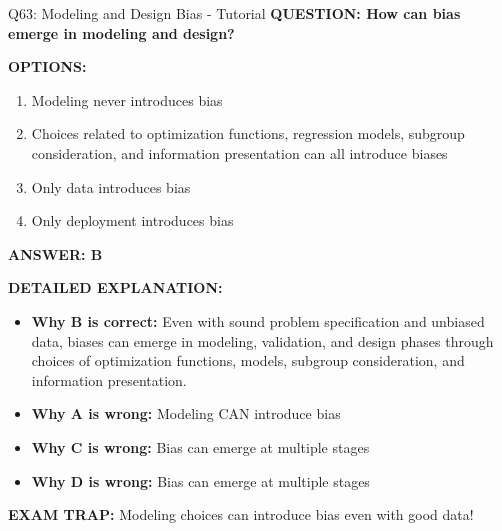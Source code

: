 \documentclass[8pt]{beamer}
\begin{document}
	\begin{frame}{Q63: Modeling and Design Bias - Tutorial}
		\fontsize{6.5}{7.5}\selectfont
		\textbf{QUESTION: How can bias emerge in modeling and design?}
		
		\vspace{0.1cm}
		\textbf{OPTIONS:}
		\begin{enumerate}
			\item Modeling never introduces bias
			\item Choices related to optimization functions, regression models, subgroup consideration, and information presentation can all introduce biases
			\item Only data introduces bias
			\item Only deployment introduces bias
		\end{enumerate}
		
		\vspace{0.1cm}
		\textcolor{myblue}{\textbf{ANSWER: B}}
		
		\vspace{0.1cm}
		\textbf{DETAILED EXPLANATION:}
		\begin{itemize}
			\item \textbf{Why B is correct:} Even with sound problem specification and unbiased data, biases can emerge in modeling, validation, and design phases through choices of optimization functions, models, subgroup consideration, and information presentation.
			\item \textbf{Why A is wrong:} Modeling CAN introduce bias
			\item \textbf{Why C is wrong:} Bias can emerge at multiple stages
			\item \textbf{Why D is wrong:} Bias can emerge at multiple stages
		\end{itemize}
		
		\textcolor{myred}{\textbf{EXAM TRAP:}} Modeling choices can \textcolor{myblue}{introduce bias} even with good data!
	\end{frame}
	
\end{document}
